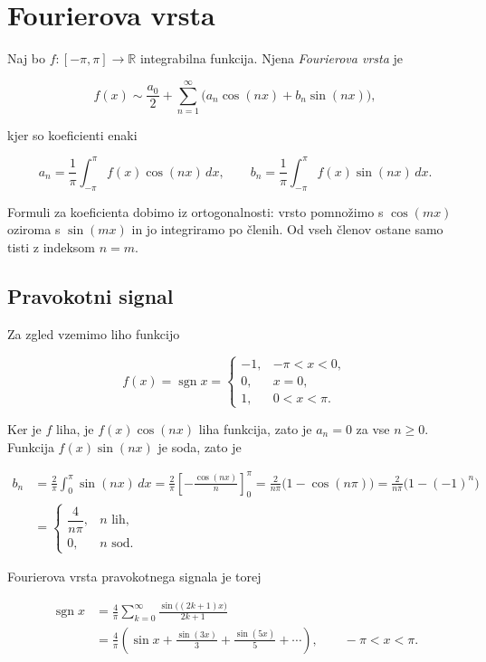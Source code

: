 \documentclass[
  slovene,
]{article}
\begin{document}
\section{Fourierova vrsta}\label{fourierova-vrsta}

Naj bo \(f \colon [-\pi, \pi] \to \mathbb{R}\) integrabilna funkcija.
Njena \emph{Fourierova vrsta} je

\[f(x) \sim \frac{a_0}{2} + \sum_{n=1}^{\infty} \bigl( a_n \cos(nx) + b_n \sin(nx) \bigr),\]

kjer so koeficienti enaki

\[a_n = \frac{1}{\pi} \int_{-\pi}^{\pi} f(x) \cos(nx) \, dx, \qquad b_n = \frac{1}{\pi} \int_{-\pi}^{\pi} f(x) \sin(nx) \, dx.\]

Formuli za koeficienta dobimo iz ortogonalnosti: vrsto pomnožimo s
\(\cos(mx)\) oziroma s \(\sin(mx)\) in jo integriramo po členih. Od vseh
členov ostane samo tisti z indeksom \(n = m\).

\subsection{Pravokotni signal}\label{pravokotni-signal}

Za zgled vzemimo liho funkcijo

\[f(x) = \operatorname{sgn} x = \begin{cases} -1, & -\pi < x < 0, \\ 0, & x = 0, \\ 1, & 0 < x < \pi. \end{cases}\]

Ker je \(f\) liha, je \(f(x) \cos(nx)\) liha funkcija, zato je
\(a_n = 0\) za vse \(n \geq 0\). Funkcija \(f(x) \sin(nx)\) je soda,
zato je

\[\begin{aligned}
b_n &= \frac{2}{\pi} \int_{0}^{\pi} \sin(nx) \, dx
= \frac{2}{\pi} \left[ -\frac{\cos(nx)}{n} \right]_{0}^{\pi}
= \frac{2}{n\pi} \bigl( 1 - \cos(n\pi) \bigr)
= \frac{2}{n\pi} \bigl( 1 - (-1)^n \bigr) \\
&= \begin{cases} \dfrac{4}{n\pi}, & n \text{ lih}, \\ 0, & n \text{ sod}. \end{cases}
\end{aligned}\]

Fourierova vrsta pravokotnega signala je torej

\[\begin{aligned}
\operatorname{sgn} x &= \frac{4}{\pi} \sum_{k=0}^{\infty} \frac{\sin\bigl((2k + 1)x\bigr)}{2k + 1} \\
&= \frac{4}{\pi} \left( \sin x + \frac{\sin(3x)}{3} + \frac{\sin(5x)}{5} + \cdots \right), \qquad -\pi < x < \pi.
\end{aligned}\]
\end{document}
